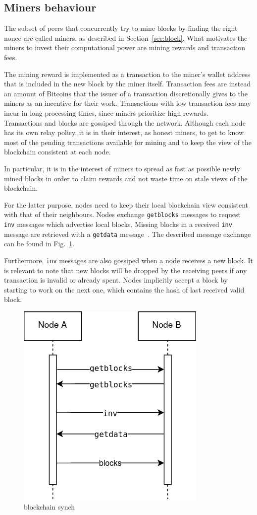 \documentclass[12pt, letterpaper, twoside]{article}
\begin{document}
\subsection{Miners behaviour}\label{sec:miners}
The subset of peers that concurrently try to mine blocks by finding the right nonce are called miners, as described in Section~\ref{sec:block}. What motivates the miners to invest their computational power are mining rewards and transaction fees.

The mining reward is implemented as a transaction to the miner's wallet address that is included in the new block by the miner itself. Transaction fees are instead an amount of Bitcoins that the issuer of a transaction discretionally gives to the miners as an incentive for their work. Transactions with low transaction fees may incur in long processing times, since miners prioritize high rewards.\\

Transactions and blocks are gossiped through the network. Although each node has its own relay policy, it is in their interest, as honest miners, to get to know most of the pending transactions available for mining and to keep the view of the blockchain consistent at each node.

In particular, it is in the interest of miners to spread as fast as possible newly mined blocks in order to claim rewards and not waste time on stale views of the blockchain.

For the latter purpose, nodes need to keep their local blockchain view consistent with that of their neighbours. Nodes exchange \texttt{getblocks} messages to request \texttt{inv} messages which advertise local blocks. Missing blocks in a received \texttt{inv} message are retrieved with a \texttt{getdata} message~\cite{protocoldoc}. The described message exchange can be found in Fig.~\ref{fig:synch}.

Furthermore, \texttt{inv} messages are also gossiped when a node receives a new block. It is relevant to note that new blocks will be dropped by the receiving peers if any transaction is invalid or already spent. Nodes implicitly accept a block by starting to work on the next one, which contains the hash of last received valid block. 

\begin{figure}[h]
	\includegraphics[width=.35\textwidth]{pict/blockchain-synch.png}
	\centering
	\caption{blockchain synch}
	\label{fig:synch}
\end{figure}
\end{document}

